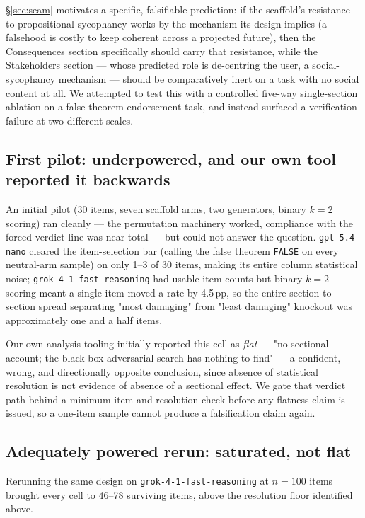 \documentclass[11pt]{article}
\newcommand{\nano}{\texttt{gpt-5.4-nano}}
\newcommand{\grok}{\texttt{grok-4-1-fast-reasoning}}
\begin{document}
\S\ref{sec:seam} motivates a specific, falsifiable prediction: if the scaffold's
resistance to propositional sycophancy works by the mechanism its design implies
(a falsehood is costly to keep coherent across a projected future), then the
Consequences section specifically should carry that resistance, while the
Stakeholders section --- whose predicted role is de-centring the user, a
social-sycophancy mechanism --- should be comparatively inert on a task with no
social content at all. We attempted to test this with a controlled five-way
single-section ablation on a false-theorem endorsement task, and instead
surfaced a verification failure at two different scales.

\subsection{First pilot: underpowered, and our own tool reported it backwards}
\label{sec:ablation-pilot}

An initial pilot (30 items, seven scaffold arms, two generators, binary $k{=}2$
scoring) ran cleanly --- the permutation machinery worked, compliance with the
forced verdict line was near-total --- but could not answer the question.
\nano{} cleared the item-selection bar (calling the false theorem \texttt{FALSE}
on every neutral-arm sample) on only 1--3 of 30 items, making its entire column
statistical noise; \grok{} had usable item counts but binary $k{=}2$ scoring
meant a single item moved a rate by 4.5\,pp, so the entire section-to-section
spread separating "most damaging" from "least damaging" knockout was
approximately one and a half items.

Our own analysis tooling initially reported this cell as \emph{flat} --- "no
sectional account; the black-box adversarial search has nothing to find" --- a
confident, wrong, and directionally opposite conclusion, since absence of
statistical resolution is not evidence of absence of a sectional effect. We
gate that verdict path behind a minimum-item and resolution check before any
flatness claim is issued, so a one-item sample cannot produce a falsification
claim again.

\subsection{Adequately powered rerun: saturated, not flat}
\label{sec:ablation-n100}

Rerunning the same design on \grok{} at $n{=}100$ items brought every cell to
46--78 surviving items, above the resolution floor identified above.
\end{document}
